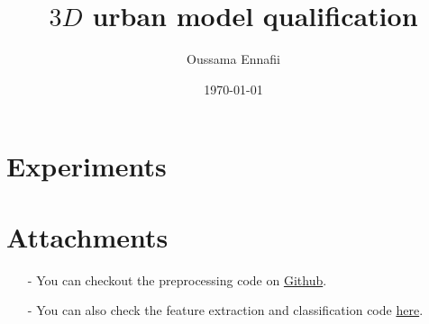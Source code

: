 \documentclass[a4paper, 11pt]{article}
\title{$3D$ urban model qualification}
\author{Oussama Ennafii}
\date{\today}
\begin{document}
	\maketitle

	

	

	

	\section{Experiments}
	

	\section*{Attachments}
	\begin{itemize}
		\item[-] You can checkout the preprocessing code on
		\href{https://github.com/ethiy/proj.city}{Github}.
		\item[-] You can also check the feature extraction and classification code
		\href{https://github.com/ethiy/qualcity}{here}.
	\end{itemize}

	
	
\end{document}
